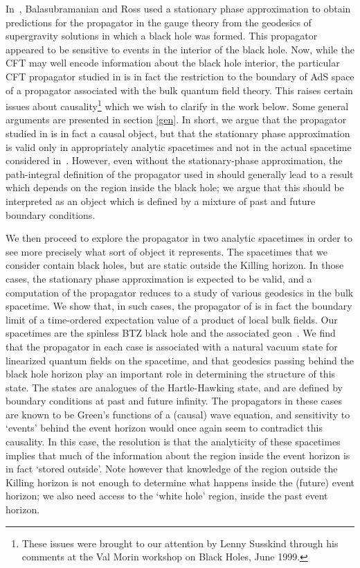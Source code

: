 \documentclass[a4paper,12pt]{article}
\begin{document}
In~\cite{holopart}, Balasubramanian and Ross used a stationary phase
approximation to obtain predictions for the propagator in the gauge
theory from the geodesics of supergravity solutions in which a black
hole was formed.  This propagator appeared to be sensitive to events
in the interior of the black hole.  Now, while the CFT may well encode
information about the black hole interior, the particular CFT
propagator studied in \cite{holopart} is in fact the restriction to
the boundary of AdS space of a propagator associated with the bulk
quantum field theory.  This raises certain issues about
causality\footnote{These issues were brought to our attention by Lenny
Susskind through his comments at the Val Morin workshop on Black
Holes, June 1999.} which we wish to clarify in the work below.  Some
general arguments are presented in section \ref{gen}.  In short, we
argue that the propagator studied in \cite{holopart} is in fact a
causal object, but that the stationary phase approximation is valid
only in appropriately analytic spacetimes and not in the actual
spacetime considered in~\cite{holopart}. However, even without the
stationary-phase approximation, the path-integral definition of the
propagator used in \cite{holopart} should generally lead to a result
which depends on the region inside the black hole; we argue that this
should be interpreted as an object which is defined by a mixture of
past and future boundary conditions.

We then proceed to explore the propagator in two analytic spacetimes
in order to see more precisely what sort of object it represents.  The
spacetimes that we consider contain black holes, but are static
outside the Killing horizon.  In those cases, the stationary phase
approximation is expected to be valid, and a computation of the
propagator reduces to a study of various geodesics in the bulk
spacetime.  We show that, in such cases, the propagator of
\cite{holopart} is in fact the boundary limit of a time-ordered
expectation value of a product of local bulk fields.  Our spacetimes
are the spinless BTZ black hole
\cite{BTZ} and the associated \coordHE{}
geon~\cite{louko:geon}.  We find that the propagator in each case
is associated with a natural vacuum state for linearized quantum
fields on the spacetime, and that geodesics passing behind the black
hole horizon play an important role in determining the structure of
this state.  The states are analogues of the Hartle-Hawking state,
and are defined by boundary conditions at past and future
infinity. The propagators in these cases are known to be Green's
functions of a (causal) wave equation, and sensitivity to `events'
behind the event horizon would once again seem to contradict this
causality. In this case, the resolution is that the analyticity of
these spacetimes implies that much of the information about the region
inside the event horizon is in fact `stored outside'. Note however
that knowledge of the region outside the Killing horizon is not enough
to determine what happens inside the (future) event horizon; we also
need access to the `white hole' region, inside the past event horizon.
\end{document}
